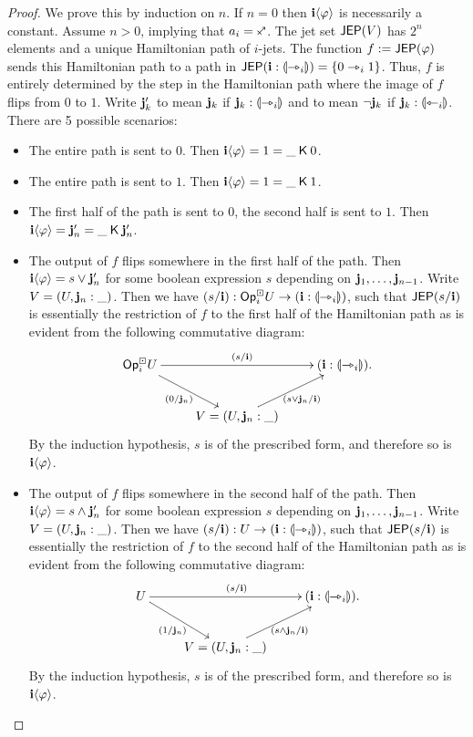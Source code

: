 \documentclass[a4paper]{memoir}
\begin{document}
\begin{proof}
	We prove this by induction on $n$.
	If $n = 0$ then $\mathbf{i} \langle \varphi \rangle$ is necessarily a constant.
	Assume $n > 0$, implying that $a_i = \ypolar$.
	The jet set $\mathsf{JEP}(V)$ has $2^n$ elements and a unique Hamiltonian path of $i$-jets.
	The function $f := \mathsf{JEP}(\varphi)$ sends this Hamiltonian path to a path in $\mathsf{JEP}(\mathbf{i} : {\llparenthesis \rightarrowtriangle_i \rrparenthesis}) = \mathopen{}\left\{ 0 \rightarrowtriangle_i 1 \right\}\mathclose{}$.
	Thus, $f$ is entirely determined by the step in the Hamiltonian path where the image of $f$ flips from $0$ to $1$.
	Write $\mathbf{j}_k'$ to mean $\mathbf{j}_k$ if $\mathbf{j}_k : {\llparenthesis \rightarrowtriangle_i \rrparenthesis}$ and to mean $\lnot \mathbf{j}_k$ if $\mathbf{j}_k : {\llparenthesis \leftarrowtriangle_i \rrparenthesis}$.
	There are 5 possible scenarios:
	\begin{itemize}
		\item The entire path is sent to $0$. Then $\mathbf{i} \langle \varphi \rangle = 1 = \_ \mathbin{\mathsf{K}} 0$.
		\item The entire path is sent to $1$. Then $\mathbf{i} \langle \varphi \rangle = 1 = \_ \mathbin{\mathsf{K}} 1$.
		\item The first half of the path is sent to $0$, the second half is sent to $1$. Then $\mathbf{i} \langle \varphi \rangle = \mathbf{j}_n' = \_ \mathbin{\mathsf{K}} \mathbf{j}_n'$.
		\item The output of $f$ flips somewhere in the first half of the path.
		Then $\mathbf{i} \langle \varphi \rangle = s \vee \mathbf{j}_n'$ for some boolean expression $s$ depending on $\mathbf{j}_1, \ldots, \mathbf{j}_{n-1}$.
		Write $V = (U, \mathbf{j}_n : \_)$.
		Then we have $(s/\mathbf{i}) : {\mathsf{Op}}^\boxdot_i U \to (\mathbf{i} : {\llparenthesis \rightarrowtriangle_i \rrparenthesis})$, such that $\mathsf{JEP}(s/\mathbf{i})$ is essentially the restriction of $f$ to the first half of the Hamiltonian path as is evident from the following commutative diagram:
		\[
			\xymatrix{
				\Opcube_i U
					\ar[rr]^{(s/\dm i)}
					\ar[rd]_{(0/\dm j_n)}
				&&
				(\dm i : \rival{\jet_i}).
				\\
				& V = (U, \dm j_n : \_)
					\ar[ru]_{(s \vee \dm j_n / \dm i)}
			}
		\]
		By the induction hypothesis, $s$ is of the prescribed form, and therefore so is $\mathbf{i} \langle \varphi \rangle$.
		\item The output of $f$ flips somewhere in the second half of the path.
		Then $\mathbf{i} \langle \varphi \rangle = s \wedge \mathbf{j}_n'$ for some boolean expression $s$ depending on $\mathbf{j}_1, \ldots, \mathbf{j}_{n-1}$.
		Write $V = (U, \mathbf{j}_n : \_)$.
		Then we have $(s/\mathbf{i}) : U \to (\mathbf{i} : {\llparenthesis \rightarrowtriangle_i \rrparenthesis})$, such that $\mathsf{JEP}(s/\mathbf{i})$ is essentially the restriction of $f$ to the second half of the Hamiltonian path as is evident from the following commutative diagram:
		\[
			\xymatrix{
				U
					\ar[rr]^{(s/\dm i)}
					\ar[rd]_{(1/\dm j_n)}
				&&
				(\dm i : \rival{\jet_i}).
				\\
				& V = (U, \dm j_n : \_)
					\ar[ru]_{(s \wedge \dm j_n / \dm i)}
			}
		\]
		By the induction hypothesis, $s$ is of the prescribed form, and therefore so is $\mathbf{i} \langle \varphi \rangle$. \qedhere
	\end{itemize}
\end{proof}
\end{document}
